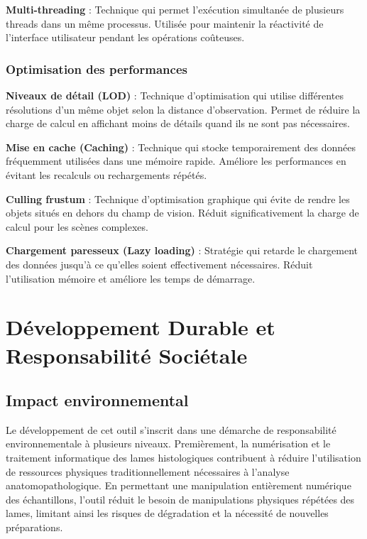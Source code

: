 \documentclass[12pt,a4paper]{report}
\let\oldchapter\chapter
\renewcommand{\chapter}{\clearpage\oldchapter}
\begin{document}
\begin{}
\begin{}
\begin{}
\begin{}
\textbf{Multi-threading} : Technique qui permet l'exécution simultanée de plusieurs threads dans un même processus. Utilisée pour maintenir la réactivité de l'interface utilisateur pendant les opérations coûteuses.

\subsection{Optimisation des performances}

\textbf{Niveaux de détail (LOD)} : Technique d'optimisation qui utilise différentes résolutions d'un même objet selon la distance d'observation. Permet de réduire la charge de calcul en affichant moins de détails quand ils ne sont pas nécessaires.

\textbf{Mise en cache (Caching)} : Technique qui stocke temporairement des données fréquemment utilisées dans une mémoire rapide. Améliore les performances en évitant les recalculs ou rechargements répétés.

\textbf{Culling frustum} : Technique d'optimisation graphique qui évite de rendre les objets situés en dehors du champ de vision. Réduit significativement la charge de calcul pour les scènes complexes.

\textbf{Chargement paresseux (Lazy loading)} : Stratégie qui retarde le chargement des données jusqu'à ce qu'elles soient effectivement nécessaires. Réduit l'utilisation mémoire et améliore les temps de démarrage.

\chapter{Développement Durable et Responsabilité Sociétale}

\clearpage

\section{Impact environnemental}

Le développement de cet outil s'inscrit dans une démarche de responsabilité environnementale à plusieurs niveaux. Premièrement, la numérisation et le traitement informatique des lames histologiques contribuent à réduire l'utilisation de ressources physiques traditionnellement nécessaires à l'analyse anatomopathologique. En permettant une manipulation entièrement numérique des échantillons, l'outil réduit le besoin de manipulations physiques répétées des lames, limitant ainsi les risques de dégradation et la nécessité de nouvelles préparations.


\end{}
\end{}
\end{}
\end{}
\end{document}
